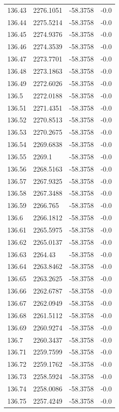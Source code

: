 \begin{table}[H]
\begin{tabular}{llll}
136.43 & 2276.1051 & -58.3758 & -0.0 \\
136.44 & 2275.5214 & -58.3758 & -0.0 \\
136.45 & 2274.9376 & -58.3758 & -0.0 \\
136.46 & 2274.3539 & -58.3758 & -0.0 \\
136.47 & 2273.7701 & -58.3758 & -0.0 \\
136.48 & 2273.1863 & -58.3758 & -0.0 \\
136.49 & 2272.6026 & -58.3758 & -0.0 \\
136.5 & 2272.0188 & -58.3758 & -0.0 \\
136.51 & 2271.4351 & -58.3758 & -0.0 \\
136.52 & 2270.8513 & -58.3758 & -0.0 \\
136.53 & 2270.2675 & -58.3758 & -0.0 \\
136.54 & 2269.6838 & -58.3758 & -0.0 \\
136.55 & 2269.1 & -58.3758 & -0.0 \\
136.56 & 2268.5163 & -58.3758 & -0.0 \\
136.57 & 2267.9325 & -58.3758 & -0.0 \\
136.58 & 2267.3488 & -58.3758 & -0.0 \\
136.59 & 2266.765 & -58.3758 & -0.0 \\
136.6 & 2266.1812 & -58.3758 & -0.0 \\
136.61 & 2265.5975 & -58.3758 & -0.0 \\
136.62 & 2265.0137 & -58.3758 & -0.0 \\
136.63 & 2264.43 & -58.3758 & -0.0 \\
136.64 & 2263.8462 & -58.3758 & -0.0 \\
136.65 & 2263.2625 & -58.3758 & -0.0 \\
136.66 & 2262.6787 & -58.3758 & -0.0 \\
136.67 & 2262.0949 & -58.3758 & -0.0 \\
136.68 & 2261.5112 & -58.3758 & -0.0 \\
136.69 & 2260.9274 & -58.3758 & -0.0 \\
136.7 & 2260.3437 & -58.3758 & -0.0 \\
136.71 & 2259.7599 & -58.3758 & -0.0 \\
136.72 & 2259.1762 & -58.3758 & -0.0 \\
136.73 & 2258.5924 & -58.3758 & -0.0 \\
136.74 & 2258.0086 & -58.3758 & -0.0 \\
136.75 & 2257.4249 & -58.3758 & -0.0 \\

\end{tabular}
\end{table}
